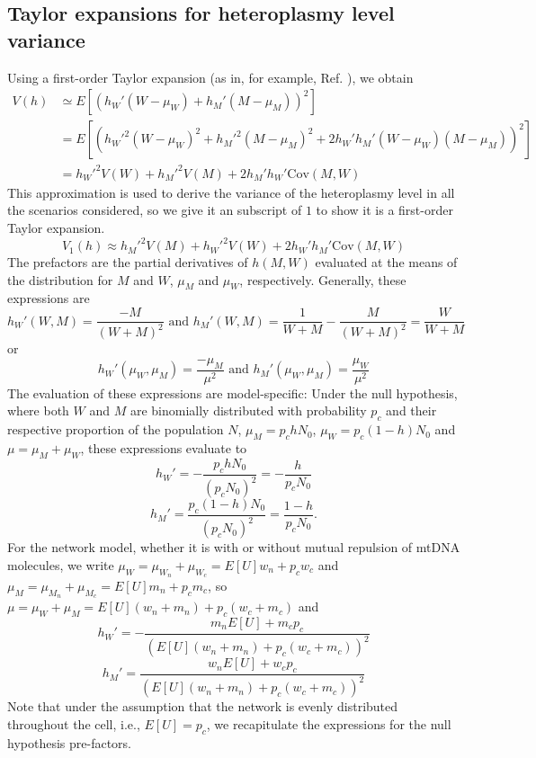 \documentclass{article}
\begin{document}
\begin{appendices}
\subsection{Taylor expansions for heteroplasmy level variance}\label{app:taylor}
Using a first-order Taylor expansion (as in, for example, Ref. \cite{johnston2015stochastic}), we obtain
\begin{equation*}
    \begin{split}
    V(h) 
 & 
     \simeq  E[(h_W'(W-\mu_W)+h_M'(M-\mu_M))^2]\\
 & = E[(h_W'^2(W-\mu_W)^2+h_M'^2(M-\mu_M)^2
 + 2h_W'h_M'(W-\mu_W)(M-\mu_M))^2]\\
 & = h_W'^2V(W)+h_M'^2V(M)+2h_M'h_W'\mathrm{Cov}(M,W)
   \end{split}
\end{equation*}
This approximation is used to derive the variance of the heteroplasmy level in all the scenarios considered, so we give it an subscript of $1$ to show it is a first-order Taylor expansion.
\begin{equation}\label{eq:app-V1h-general}
    V_1(h)\approx h_M'^2V(M) +
h_W'^2V(W)+2h_W'h_M'\mathrm{Cov}(M,W)
\end{equation}
The prefactors are the partial derivatives of $h(M,W)$ evaluated at the means of the distribution for $M$ and $W$, $\mu_M$ and $\mu_W$, respectively. Generally, these expressions are 
\begin{equation}
h_W'(W,M)=\frac{-M}{(W+M)^2} \text{\ \ and \ \ }
h_M'(W,M)=\frac{1}{W+M}-\frac{M}{(W+M)^2}=\frac{W}{W+M}
\end{equation}
or
\begin{equation}
h_W'(\mu_W,\mu_M)=\frac{-\mu_M}{\mu^2} \text{\ \ and \ \ }
h_M'(\mu_W,\mu_M)=\frac{\mu_W}{\mu^2}
\end{equation}
The evaluation of these expressions are model-specific: Under the null hypothesis, where both $W$ and $M$ are binomially distributed with probability $p_c$ and their respective proportion of the population $N$, $\mu_M=p_chN_0$, $\mu_W=p_c(1-h)N_0$ and $\mu = \mu_M+\mu_W$, these expressions evaluate to
\begin{equation}\label{eq:null-hW.prime}
h_W'=-\frac{p_chN_0}{(p_cN_0)^2}=-\frac{h}{p_cN_0}
\end{equation}
\begin{equation}\label{eq:null-hM.prime}
h_M'=\frac{p_c(1-h)N_0}{(p_cN_0)^2}=\frac{1-h}{p_cN_0}.
\end{equation}
For the network model, whether it is with or without mutual repulsion of mtDNA molecules, we write $\mu_W=\mu_{W_n}+\mu_{W_c}=E[U] w_n +p_cw_c$ and $\mu_M=\mu_{M_n}+\mu_{M_c}=E[U] m_n+p_cm_c$, so $\mu=\mu_W+\mu_M=E[U](w_n+m_n)+p_c(w_c+m_c)$ and
\begin{equation}\label{eq:net-hW.prime}
h_W'=-\frac{m_nE[U]+m_cp_c}{(E[U](w_n+m_n)+p_c(w_c+m_c))^2}
\end{equation}
\begin{equation}\label{eq:net-hM.prime}
h_M' = \frac{w_nE[U]+w_cp_c}{(E[U](w_n+m_n)+p_c(w_c+m_c))^2}
\end{equation}
Note that under the assumption that the network is evenly distributed throughout the cell, i.e., $E[U]=p_c$, we recapitulate the expressions for the null hypothesis pre-factors.

\end{appendices}
\end{document}
